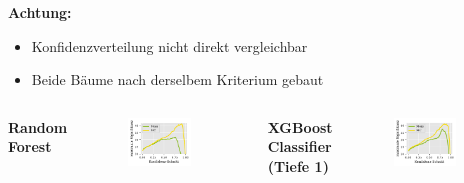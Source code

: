 \documentclass[aspectratio=1610, professionalfonts, 9pt]{beamer}
\begin{document}
\begin{frame}
  \Large \bf Achtung:
  \begin{itemize}
	\item Konfidenzverteilung nicht direkt vergleichbar
	\item Beide Bäume nach derselbem Kriterium gebaut
  \end{itemize}
  \begin{columns}[onlytextwidth]
	\Large \bf Random Forest
	\begin{figure}
	  \centering
	  \includegraphics[width=0.8\textwidth]{./Plots/sig_mess_tree.pdf}
	\end{figure}
	\Large \bf XGBoost Classifier (Tiefe 1)
	\begin{figure}
	  \centering
	  \includegraphics[width=0.8\textwidth]{./Plots/sig_mess_xgbc.pdf}
	\end{figure}
  \end{columns}
\end{frame}
\end{document}
